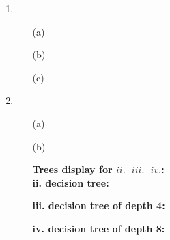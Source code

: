 
\usepackage{amsmath}
\usepackage{graphicx}
\usepackage{amsfonts}
\usepackage{amssymb}
\usepackage{array,multirow}
\usepackage{rotating}
\oddsidemargin 0in
\evensidemargin 0in
\textwidth 6.5in
\topmargin -0.5in
\textheight 9.0in




\pagestyle{myheadings}  %

\begin{enumerate}
\item 
	\begin{itemize}  
		\item[(a)] 
		
		\item[(b)]
		
 		\item[(c)]
		
 	\end{itemize}
\item
	\begin{itemize}  
		\item[(a)] 
		
		\item[(b)] 
		
		\clearpage
		\textbf{Trees display for $ii. \mbox{ } iii. \mbox{ } iv.$: }\\
		\textbf{ii. decision tree:}
		
		\clearpage
		\textbf{iii. decision tree of depth 4:}
		
		\textbf{iv. decision tree of depth 8:}
		
 	\end{itemize}
\end{enumerate}

